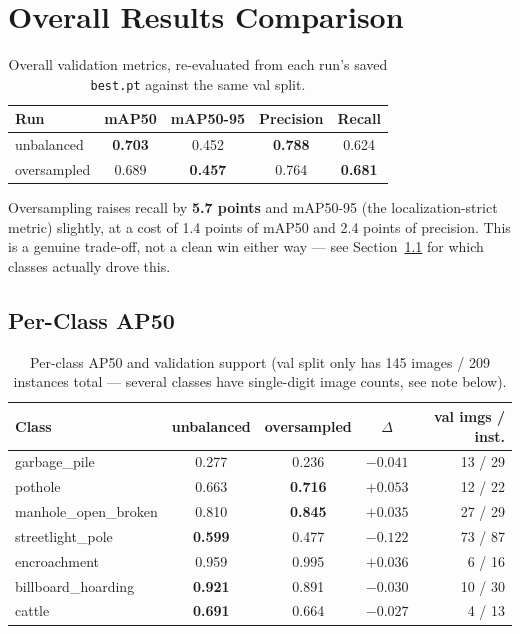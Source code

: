\documentclass[11pt]{article}
\begin{document}
\section{Overall Results Comparison}

\begin{table}[H]
\centering
\caption{Overall validation metrics, re-evaluated from each run's saved \texttt{best.pt}
against the same val split.}
\begin{tabular}{lcccc}
\toprule
\textbf{Run} & \textbf{mAP50} & \textbf{mAP50-95} & \textbf{Precision} & \textbf{Recall} \\
\midrule
unbalanced   & \textbf{0.703} & 0.452 & \textbf{0.788} & 0.624 \\
oversampled  & 0.689 & \textbf{0.457} & 0.764 & \textbf{0.681} \\
\bottomrule
\end{tabular}
\end{table}

\noindent Oversampling raises recall by \textbf{5.7 points} and mAP50-95 (the
localization-strict metric) slightly, at a cost of 1.4 points of mAP50 and 2.4 points of
precision. This is a genuine trade-off, not a clean win either way — see
Section~\ref{sec:perclass} for which classes actually drove this.

\subsection{Per-Class AP50}
\label{sec:perclass}

\begin{table}[H]
\centering
\caption{Per-class AP50 and validation support (val split only has 145 images / 209
instances total — several classes have single-digit image counts, see note below).}
\begin{tabular}{lccc r}
\toprule
\textbf{Class} & \textbf{unbalanced} & \textbf{oversampled} & \textbf{$\Delta$} & \textbf{val imgs / inst.} \\
\midrule
garbage\_pile          & 0.277 & 0.236 & \textcolor{bad}{$-0.041$}  & 13 / 29 \\
pothole                & 0.663 & \textbf{0.716} & \textcolor{good}{$+0.053$} & 12 / 22 \\
manhole\_open\_broken  & 0.810 & \textbf{0.845} & \textcolor{good}{$+0.035$} & 27 / 29 \\
streetlight\_pole      & \textbf{0.599} & 0.477 & \textcolor{bad}{$-0.122$} & 73 / 87 \\
encroachment           & 0.959 & 0.995 & \textcolor{good}{$+0.036$} & 6 / 16 \\
billboard\_hoarding    & \textbf{0.921} & 0.891 & \textcolor{bad}{$-0.030$} & 10 / 30 \\
cattle                 & \textbf{0.691} & 0.664 & \textcolor{bad}{$-0.027$} & 4 / 13 \\
\bottomrule
\end{tabular}
\end{table}
\end{document}
